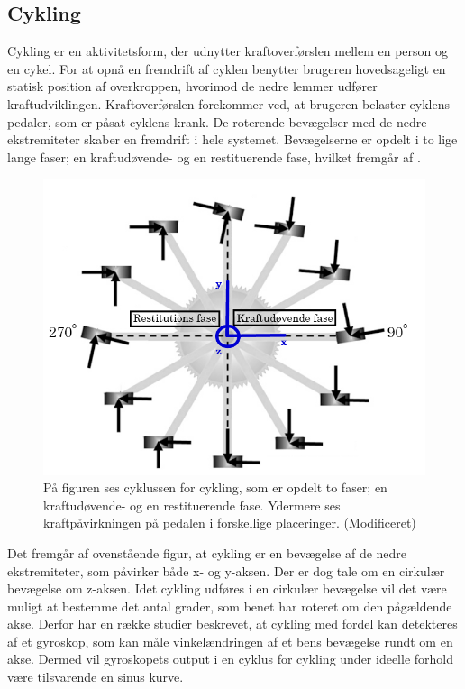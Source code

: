 \subsection{Cykling}
Cykling er en aktivitetsform, der udnytter kraftoverførslen mellem en person og en cykel. For at opnå en fremdrift af cyklen benytter brugeren hovedsageligt en statisk position af overkroppen, hvorimod de nedre lemmer udfører kraftudviklingen. \citep{Springer2014} Kraftoverførslen forekommer ved, at brugeren belaster cyklens pedaler, som er påsat cyklens krank. De roterende bevægelser med de nedre ekstremiteter skaber en fremdrift i hele systemet. Bevægelserne er opdelt i to lige lange faser; en kraftudøvende- og en restituerende fase, hvilket fremgår af .
\begin{figure}[H]
	\centering
	\includegraphics[scale=0.45]{figures/bProblemloesning/cykel_cyklus.png}
	\caption{På figuren ses cyklussen for cykling, som er opdelt to faser; en kraftudøvende- og en restituerende fase. Ydermere ses kraftpåvirkningen på pedalen i forskellige placeringer. \citep{Springer2014} (Modificeret)}
	\label{fig:cykel_cyklus}
\end{figure}
Det fremgår af ovenstående figur, at cykling er en bevægelse af de nedre ekstremiteter, som påvirker både x- og y-aksen. Der er dog tale om en cirkulær bevægelse om z-aksen. Idet cykling udføres i en cirkulær bevægelse vil det være muligt at bestemme det antal grader, som benet har roteret om den pågældende akse. Derfor har en række studier beskrevet, at cykling med fordel kan detekteres af et gyroskop, som kan måle vinkelændringen af et bens bevægelse rundt om en akse. Dermed vil gyroskopets output i en cyklus for cykling under ideelle forhold være tilsvarende en sinus kurve. \citep{Cockcroft2011,Marin-PerianuMarin-Perianu2013} 


